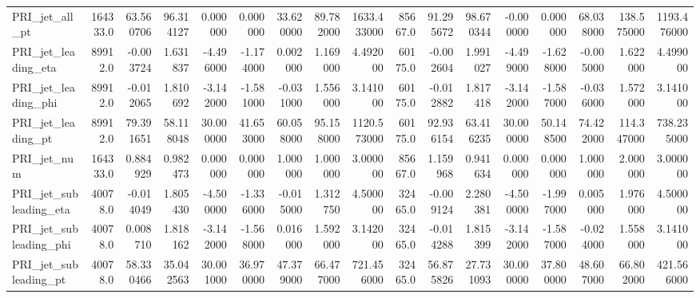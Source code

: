 \begin{tabular}{lrrrrrrrrrrrrrrrr}
PRI\_jet\_all\_pt              &  164333.0 &      63.560706 &     96.314127 &       0.000000 &       0.000000 &      33.620000 &      89.782000 &    1633.433000 &  85667.0 &      91.295672 &     98.670344 &      -0.000000 &       0.000000 &      68.038000 &     138.575000 &    1193.476000 \\
PRI\_jet\_leading\_eta         &   89912.0 &      -0.003724 &      1.631837 &      -4.496000 &      -1.174000 &       0.002000 &       1.169000 &       4.492000 &  60175.0 &      -0.002604 &      1.991027 &      -4.499000 &      -1.628000 &      -0.005000 &       1.622000 &       4.499000 \\
PRI\_jet\_leading\_phi         &   89912.0 &      -0.012065 &      1.810692 &      -3.142000 &      -1.581000 &      -0.031000 &       1.556000 &       3.141000 &  60175.0 &      -0.012882 &      1.817418 &      -3.142000 &      -1.587000 &      -0.036000 &       1.572000 &       3.141000 \\
PRI\_jet\_leading\_pt          &   89912.0 &      79.391651 &     58.118048 &      30.000000 &      41.653000 &      60.058000 &      95.158000 &    1120.573000 &  60175.0 &      92.936154 &     63.416235 &      30.000000 &      50.148500 &      74.422000 &     114.347000 &     738.235000 \\
PRI\_jet\_num                 &  164333.0 &       0.884929 &      0.982473 &       0.000000 &       0.000000 &       1.000000 &       1.000000 &       3.000000 &  85667.0 &       1.159968 &      0.941634 &       0.000000 &       0.000000 &       1.000000 &       2.000000 &       3.000000 \\
PRI\_jet\_subleading\_eta      &   40078.0 &      -0.014049 &      1.805430 &      -4.500000 &      -1.336000 &      -0.015000 &       1.312750 &       4.500000 &  32465.0 &      -0.009124 &      2.280381 &      -4.500000 &      -1.997000 &       0.005000 &       1.976000 &       4.500000 \\
PRI\_jet\_subleading\_phi      &   40078.0 &       0.008710 &      1.818162 &      -3.142000 &      -1.568000 &       0.016000 &       1.592000 &       3.142000 &  32465.0 &      -0.014288 &      1.815399 &      -3.142000 &      -1.587000 &      -0.024000 &       1.558000 &       3.141000 \\
PRI\_jet\_subleading\_pt       &   40078.0 &      58.330466 &     35.042563 &      30.001000 &      36.970000 &      47.379000 &      66.477000 &     721.456000 &  32465.0 &      56.875826 &     27.731093 &      30.000000 &      37.800000 &      48.607000 &      66.802000 &     421.566000 \\

\end{tabular}
